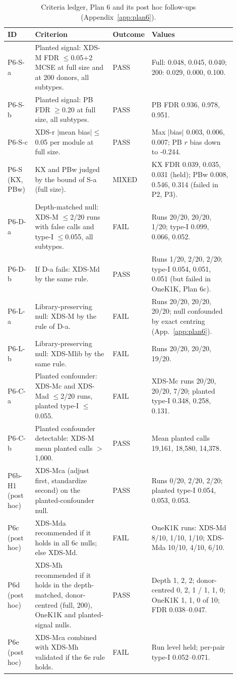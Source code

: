\begin{table}[h]\centering\scriptsize\caption{Criteria ledger, Plan 6 and its post hoc follow-ups (Appendix~\ref{app:plan6}).}\label{tab:criteria_plan6}
\begin{tabular}{@{}p{0.12\linewidth}p{0.34\linewidth}p{0.07\linewidth}p{0.37\linewidth}@{}}\toprule ID & Criterion & Outcome & Values\\\midrule
P6-S-a & Planted signal: XDS-M FDR $\le$0.05+2 MCSE at full size and at 200 donors, all subtypes. & PASS & Full: 0.048, 0.045, 0.040; 200: 0.029, 0.000, 0.100. \\
P6-S-b & Planted signal: PB FDR $\ge$0.20 at full size, all subtypes. & PASS & PB FDR 0.936, 0.978, 0.951. \\
P6-S-c & XDS-r $|$mean bias$|\le$0.05 per module at full size. & PASS & Max $|$bias$|$ 0.003, 0.006, 0.007; PB $r$ bias down to -0.244. \\
P6-S (KX, PBw) & KX and PBw judged by the bound of S-a (full size). & MIXED & KX FDR 0.039, 0.035, 0.031 (held); PBw 0.008, 0.546, 0.314 (failed in P2, P3). \\
P6-D-a & Depth-matched null: XDS-M $\le$2/20 runs with false calls and type-I $\le$0.055, all subtypes. & FAIL & Runs 20/20, 20/20, 1/20; type-I 0.099, 0.066, 0.052. \\
P6-D-b & If D-a fails: XDS-Md by the same rule. & PASS & Runs 1/20, 2/20, 2/20; type-I 0.054, 0.051, 0.051 (but failed in OneK1K, Plan 6c). \\
P6-L-a & Library-preserving null: XDS-M by the rule of D-a. & FAIL & Runs 20/20, 20/20, 20/20; null confounded by exact centring (App.~\ref{app:plan6}). \\
P6-L-b & Library-preserving null: XDS-Mlib by the same rule. & FAIL & Runs 20/20, 20/20, 19/20. \\
P6-C-a & Planted confounder: XDS-Mc and XDS-Mad $\le$2/20 runs, planted type-I $\le$0.055. & FAIL & XDS-Mc runs 20/20, 20/20, 7/20; planted type-I 0.348, 0.258, 0.131. \\
P6-C-b & Planted confounder detectable: XDS-M mean planted calls $>$1,000. & PASS & Mean planted calls 19{,}161, 18{,}580, 14{,}378. \\
P6b-H1 (post hoc) & XDS-Mca (adjust first, standardize second) on the planted-confounder null. & PASS & Runs 0/20, 2/20, 2/20; planted type-I 0.054, 0.053, 0.053. \\
P6c (post hoc) & XDS-Mda recommended if it holds in all 6c nulls; else XDS-Md. & FAIL & OneK1K runs: XDS-Md 8/10, 1/10, 1/10; XDS-Mda 10/10, 4/10, 6/10. \\
P6d (post hoc) & XDS-Mh recommended if it holds in the depth-matched, donor-centred (full, 200), OneK1K and planted-signal nulls. & PASS & Depth 1, 2, 2; donor-centred 0, 2, 1 / 1, 1, 0; OneK1K 1, 1, 0 of 10; FDR 0.038--0.047. \\
P6e (post hoc) & XDS-Mca combined with XDS-Mh validated if the 6e rule holds. & FAIL & Run level held; per-pair type-I 0.052--0.071. \\
\bottomrule\end{tabular}\end{table}
